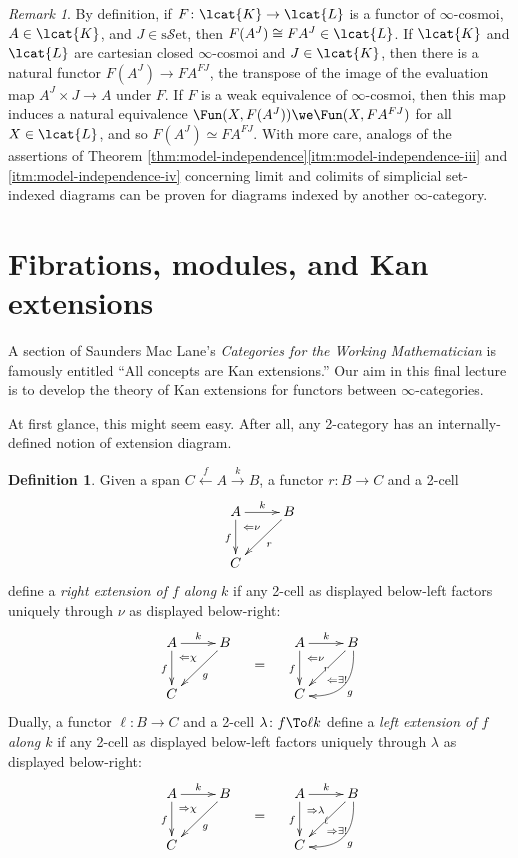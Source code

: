 \documentclass[12pt,reqno]{amsart}
\theoremstyle{plain}
\theoremstyle{definition}
\newtheorem{defn}[thm]{Definition}
\theoremstyle{remark}
\newtheorem{rmk}[thm]{Remark}
\numberwithin{equation}{subsection}
\renewcommand{\sSet}{\mathrm{s}\mathcal{S}\mathrm{et}}
\begin{document}
\begin{rmk} By definition, if $F \colon \lcat{K} \to \lcat{L}$ is a functor of $\infty$-cosmoi, $A \in \lcat{K}$, and $J \in \sSet$, then $F(A^J) \cong FA^J \in \lcat{L}$. If $\lcat{K}$ and $\lcat{L}$ are cartesian closed $\infty$-cosmoi and $J \in \lcat{K}$, then there is a natural functor $F(A^J) \to FA^{FJ}$, the transpose of the image of the evaluation map $A^J \times J \to A$ under $F$. If $F$ is a weak equivalence of $\infty$-cosmoi, then this map induces a natural equivalence $\Fun(X, F(A^J)) \we \Fun(X, FA^{FJ})$ for all $X\in\lcat{L}$, and so $F(A^J) \simeq FA^{FJ}$. With more care, analogs of the assertions of Theorem \ref{thm:model-independence}\ref{itm:model-independence-iii} and \ref{itm:model-independence-iv} concerning limit and colimits of simplicial set-indexed diagrams can be proven for diagrams indexed by another $\infty$-category.
\end{rmk}


\renewcommand\thesection{Lecture~\arabic{section}}
\section{Fibrations, modules, and Kan extensions}\label{sec:modules}
\renewcommand\thesection{\arabic{section}}


A section of Saunders Mac Lane's \emph{Categories for the Working Mathematician}  is famously entitled ``All concepts are Kan extensions.'' Our aim in this final lecture is to develop the theory of Kan extensions for functors between $\infty$-categories.

At first glance, this might seem easy. After all, any 2-category has an internally-defined notion of extension diagram.

\begin{defn}\label{defn:right-ext} Given a span $C \xleftarrow{f} A \xrightarrow{k} B$, a functor $r \colon B \to C$ and a 2-cell 
\[ \xymatrix{ A \ar[r]^k \ar[d]_f & B \ar[dl]^r \\ C & \ar@{}[ul]|(.7){\Leftarrow\nu}}\]
define a \emph{right extension of $f$ along $k$} if any 2-cell as displayed below-left factors uniquely through $\nu$ as displayed below-right:
\[    \vcenter{\xymatrix{ A \ar[d]_f \ar[r]^k \ar@{}[dr]|(.3){\Leftarrow\chi} & B \ar[dl]^g \\ C  & }} \mkern20mu = \mkern20mu \vcenter{ \xymatrix{ A \ar[r]^k \ar[d]_f & B \ar[dl]|r \ar@/^4ex/[dl]^g \\ C & \ar@{}[ul]|(.3){\Leftarrow\exists!}|(.7){\Leftarrow\nu}}}
\] Dually, a functor $\ell \colon B \to C$ and a 2-cell $\lambda \colon f \To \ell k$ define a \emph{left extension of $f$ along $k$} if any 2-cell as displayed below-left factors uniquely through $\lambda$ as displayed below-right:
\[    \vcenter{\xymatrix{ A \ar[d]_f \ar[r]^k \ar@{}[dr]|(.3){\Rightarrow\chi} & B \ar[dl]^g \\ C  & }} \mkern20mu = \mkern20mu \vcenter{ \xymatrix{ A \ar[r]^k \ar[d]_f & B \ar[dl]|\ell \ar@/^4ex/[dl]^g \\ C & \ar@{}[ul]|(.3){\Rightarrow\exists!}|(.7){\Rightarrow\lambda}}}
\] 
\end{defn}
\end{document}
